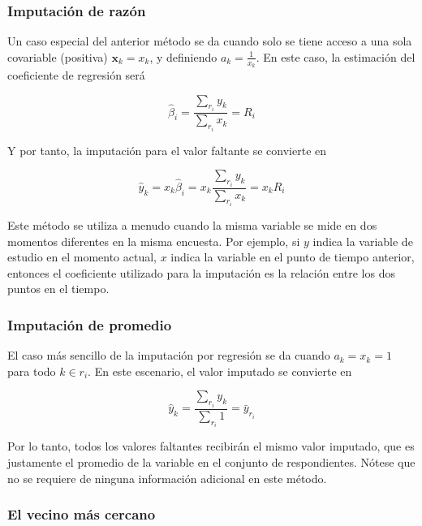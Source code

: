 \documentclass[
  10pt,
  spanish,
]{book}
\begin{document}
\hypertarget{imputaciuxf3n-de-razuxf3n}{%
\subsubsection*{Imputación de razón}\label{imputaciuxf3n-de-razuxf3n}}

Un caso especial del anterior método se da cuando solo se tiene acceso a una sola covariable (positiva) \(\mathbf{x}_k = x_k\), y definiendo \(a_k = \frac{1}{x_k}\). En este caso, la estimación del coeficiente de regresión será

\[
\hat{{\beta}}_i = \frac{\sum_{r_i}y_k}{\sum_{r_i}x_k} = R_i
\]

Y por tanto, la imputación para el valor faltante se convierte en

\[
\hat{y}_k = x_k \hat{\beta}_i = x_k \frac{\sum_{r_i}y_k}{\sum_{r_i}x_k} = x_k R_i
\]

Este método se utiliza a menudo cuando la misma variable se mide en dos momentos diferentes en la misma encuesta. Por ejemplo, si \(y\) indica la variable de estudio en el momento actual, \(x\) indica la variable en el punto de tiempo anterior, entonces el coeficiente utilizado para la imputación es la relación entre los dos puntos en el tiempo.

\hypertarget{imputaciuxf3n-de-promedio}{%
\subsubsection*{Imputación de promedio}\label{imputaciuxf3n-de-promedio}}

El caso más sencillo de la imputación por regresión se da cuando \(a_k = x_k = 1\) para todo \(k \in r_i\). En este escenario, el valor imputado se convierte en

\[
\hat{y}_k  = \frac{\sum_{r_i}y_k}{\sum_{r_i}1}= \bar{y}_{r_i}
\]

Por lo tanto, todos los valores faltantes recibirán el mismo valor imputado, que es justamente el promedio de la variable en el conjunto de respondientes. Nótese que no se requiere de ninguna información adicional en este método.

\hypertarget{el-vecino-muxe1s-cercano}{%
\subsubsection*{El vecino más cercano}\label{el-vecino-muxe1s-cercano}}
\end{document}
